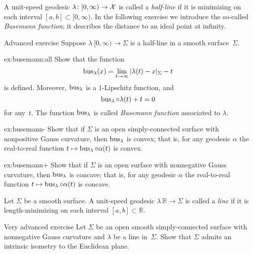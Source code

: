 A unit-speed geodesic $\lambda\colon[0,\infty)\to \mathcal{X}$ is called a \emph{half-line} if it is minimizing on each interval $[a,b]\subset [0,\infty)$.
In the following exercise we introduce the so-called
{}\emph{Busemann function};
it describes the distance to an ideal point at infinity.

\begin{thm}{Advanced exercise}\label{ex:busemann}
Suppose $\lambda\:[0,\infty)\to \Sigma$ is a half-line in a smooth surface~$\Sigma$.

\begin{subthm}{ex:busemann:all}
Show that the function 
\[\bus_\lambda(x)=\lim_{t\to\infty}\dist{\lambda(t)}{x}{\Sigma}- t\]
is defined.
Moreover, 
$\mathop{\rm bus}\nolimits_\lambda$ is a $1$-Lipschitz function, and
\[\mathop{\rm bus}\nolimits_\lambda\circ\lambda(t)+t=0\] 
for any~$t$.
The function $\mathop{\rm bus}\nolimits_\lambda$ is called \emph{Busemann function} associated to $\lambda$.
\end{subthm}

\begin{subthm}{ex:busemann-}
Show that if $\Sigma$ is an open simply-connected surface with nonpositive Gauss curvature, then $\mathop{\rm bus}\nolimits_\lambda$ is convex;
that is, for any geodesic $\alpha$ the real-to-real function 
$t\mapsto \mathop{\rm bus}\nolimits_\lambda\circ\alpha(t)$ is convex.
\end{subthm}

\begin{subthm}{ex:busemann+}
Show that if $\Sigma$ is an open surface with nonnegative Gauss curvature, then $\mathop{\rm bus}\nolimits_\lambda$ is concave;
that is, for any geodesic $\alpha$ the real-to-real function 
$t\z\mapsto \bus_\lambda\circ\alpha(t)$ is concave.
\end{subthm}

\end{thm}

Let $\Sigma$ be a smooth surface.
A unit-speed geodesic $\lambda\:\mathbb{R}\to\Sigma$ is called a \emph{line} if it is length-minimizing on each interval $[a,b]\subset \mathbb{R}$.

\begin{thm}{Very advanced exercise}\label{thm:splitting}
Let $\Sigma$ be an open smooth simply-connected surface with nonnegative Gauss curvature
and $\lambda$ be a line in~$\Sigma$. 
Show that $\Sigma$ admits an intrinsic isometry to 
the Euclidean plane.
\end{thm}

